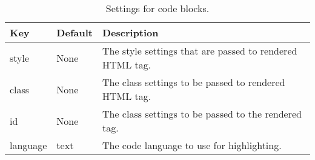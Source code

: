 \begin{table}
\center\caption{\label{code-settings}Settings for code blocks.}\par\begin{tabulary}{\textwidth}{LLL}
\toprule
Key &Default &Description \\
\midrule
style &None &The style settings that are passed to rendered HTML tag. \\
class &None &The class settings to be passed to rendered HTML tag. \\
id &None &The class settings to be passed to the rendered tag. \\
language &text &The code language to use for highlighting. \\
\bottomrule
\end{tabulary}

\end{table}
